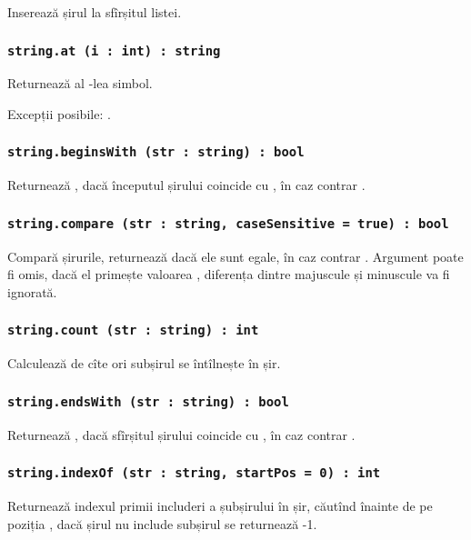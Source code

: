 Inserează șirul  la sfîrșitul listei.

\subsubsection{\lstinline|string.at (i : int) : string|}

Returnează al -lea simbol.

Excepții posibile: .

\subsubsection{\lstinline|string.beginsWith (str : string) : bool|}

Returnează \true{}, dacă începutul șirului coincide cu , în caz contrar \false{}.

\subsubsection{\lstinline|string.compare (str : string, caseSensitive = true) : bool|}

Compară șirurile, returnează \true{} dacă ele sunt egale, în caz contrar \false{}. Argument  poate fi omis, dacă el primește valoarea \false{}, diferența dintre majuscule și minuscule va fi ignorată.

\subsubsection{\lstinline|string.count (str : string) : int|}

Calculează de cîte ori subșirul  se întîlnește în șir.

\subsubsection{\lstinline|string.endsWith (str : string) : bool|}

Returnează \true{}, dacă sfîrșitul șirului coincide cu , în caz contrar \false{}.

\subsubsection{\lstinline|string.indexOf (str : string, startPos = 0) : int|}

Returnează indexul primii includeri a șubșirului  în șir, căutînd înainte de pe poziția , dacă șirul nu include subșirul se returnează -1.

